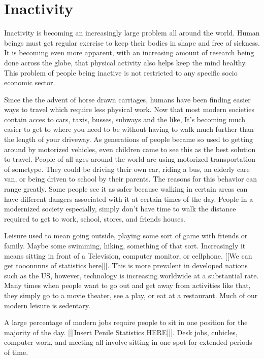 \documentclass[12pt,article]{IEEEtran}
\begin{document}
\section{Inactivity}
Inactivity is becoming an increasingly large problem all around the world. Human beings must get regular exercise to keep their bodies in shape and free of sickness. It is becoming even more apparent, with an increasing amount of research being done across the globe, that physical activity also helps keep the mind healthy. This problem of people being inactive is not restricted to any specific socio economic sector.

Since the the advent of horse drawn carriages, humans have been finding easier ways to travel which require less physical work. Now that most modern societies contain acces to cars, taxis, busses, subways and the like, It’s becoming much easier to get to where you need to be without having to walk much further than the length of your driveway.  As generations of people became so used to getting around by motorized vehicles, even children came to see this as the best solution to travel. People of all ages around the world are using motorized transportation of sometype. They could be driving their own car, riding a bus, an elderly care van, or being driven to school by their parents. The reasons for this behavior can range greatly. Some people see it as safer because walking in certain areas can have different dangers associated with it at certain times of the day. People in a modernized society especially, simply don’t have time to walk the distance required to get to work, school, stores, and friends houses. 

Leisure used to mean going outside, playing some sort of game with friends or family. Maybe some swimming, hiking, something of that sort. Increasingly it means sitting in front of a Television, computer monitor, or cellphone. [[We can get tooonnnns of statistics here]]]. This is more prevalent in developed nations such as the US, however, technology is increasing worldwide at a substantial rate. Many times when people want to go out and get away from activities like that, they simply go to a movie theater, see a play, or eat at a restaurant. Much of our modern leisure is sedentary.

A large percentage of modern jobs require people to sit in one position for the majority of the day. [[[Insert Penile Statistics HERE]]]. Desk jobs, cubicles, computer work, and meeting all involve sitting in one spot for extended periods of time.
\end{document}
